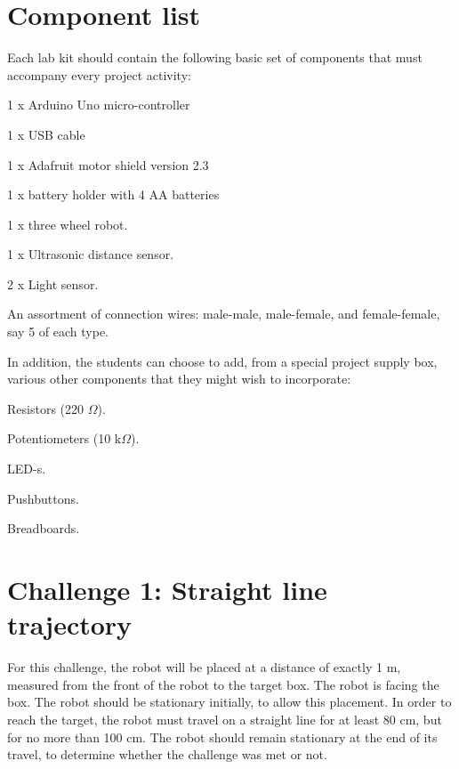 \documentclass[12pt]{book}
\begin{document}
\section{Component list}

Each lab kit should contain the following basic set of components
that must accompany every project activity:

\begin{compactitem}[--]
  \item 1 x Arduino Uno micro-controller
  \item 1 x USB cable
  \item 1 x Adafruit motor shield version 2.3
  \item 1 x battery holder with 4 AA batteries
  \item 1 x three wheel robot.
  \item 1 x Ultrasonic distance sensor.
  \item 2 x Light sensor.
  \item An assortment of connection wires: male-male, male-female, and
    female-female, say 5 of each type.
\end{compactitem}

In addition, the students can choose to add, from a special project supply
box, various other components that they might wish to incorporate:
\begin{compactitem}[--]
\item Resistors (220 $\Omega$).
\item Potentiometers (10 k$\Omega$).
\item LED-s.
\item Pushbuttons.
\item Breadboards.
\end{compactitem}



\section{Challenge 1: Straight line trajectory}\label{proj1:chap}

For this challenge, the robot will be placed at a distance of exactly
1 m, measured from the front of the robot to the target box. The robot
is facing the box. The robot should be stationary initially, to allow
this placement. In order to reach the target, the robot must travel on
a straight line for at least 80 cm, but for no more than 100 cm. The
robot should remain stationary at the end of its travel, to determine
whether the challenge was met or not.
\end{document}
